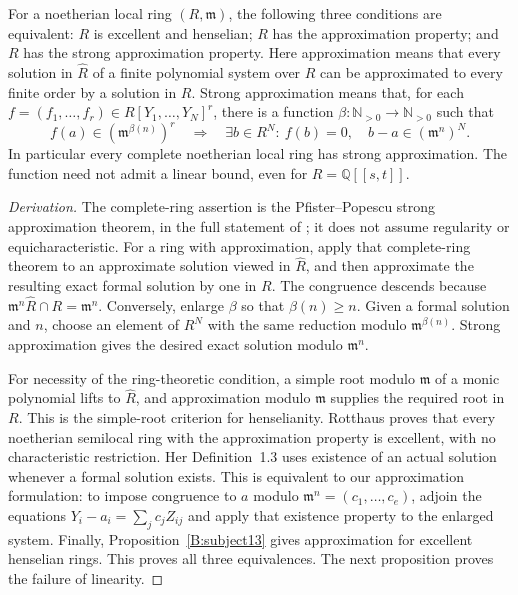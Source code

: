 \begin{theorem}\label{B:strong-approximation}
For a noetherian local ring $(R,\mathfrak m)$, the following three conditions are equivalent: $R$ is excellent and henselian; $R$ has the approximation property; and $R$ has the strong approximation property. Here approximation means that every solution in $\widehat R$ of a finite polynomial system over $R$ can be approximated to every finite order by a solution in $R$. Strong approximation means that, for each $f=(f_1,\ldots,f_r)\in R[Y_1,\ldots,Y_N]^r$, there is a function $\beta:\mathbb N_{>0}\to\mathbb N_{>0}$ such that
\[
 f(a)\in(\mathfrak m^{\beta(n)})^r
 \quad\Longrightarrow\quad
 \exists b\in R^N:\ f(b)=0,\quad b-a\in(\mathfrak m^n)^N.
\]
In particular every complete noetherian local ring has strong approximation. The function need not admit a linear bound, even for $R=\mathbb Q[[s,t]]$.
\end{theorem}
\begin{proof}[Derivation]
The complete-ring assertion is the Pfister--Popescu strong approximation theorem, in the full statement of \cite[Theorem 9]{BPopescu2017}; it does not assume regularity or equicharacteristic. For a ring with approximation, apply that complete-ring theorem to an approximate solution viewed in $\widehat R$, and then approximate the resulting exact formal solution by one in $R$. The congruence descends because $\mathfrak m^n\widehat R\cap R=\mathfrak m^n$. Conversely, enlarge $\beta$ so that $\beta(n)\ge n$. Given a formal solution and $n$, choose an element of $R^N$ with the same reduction modulo $\mathfrak m^{\beta(n)}$. Strong approximation gives the desired exact solution modulo $\mathfrak m^n$.

For necessity of the ring-theoretic condition, a simple root modulo $\mathfrak m$ of a monic polynomial lifts to $\widehat R$, and approximation modulo $\mathfrak m$ supplies the required root in $R$. This is the simple-root criterion for henselianity. Rotthaus \cite[Theorem 1, p.~455; proof \S3, pp.~464--466]{BRotthaus1990} proves that every noetherian semilocal ring with the approximation property is excellent, with no characteristic restriction. Her Definition~1.3 uses existence of an actual solution whenever a formal solution exists. This is equivalent to our approximation formulation: to impose congruence to $a$ modulo $\mathfrak m^n=(c_1,\ldots,c_e)$, adjoin the equations $Y_i-a_i=\sum_jc_jZ_{ij}$ and apply that existence property to the enlarged system. Finally, Proposition~\ref{B:subject13} gives approximation for excellent henselian rings. This proves all three equivalences. The next proposition proves the failure of linearity.
\end{proof}

